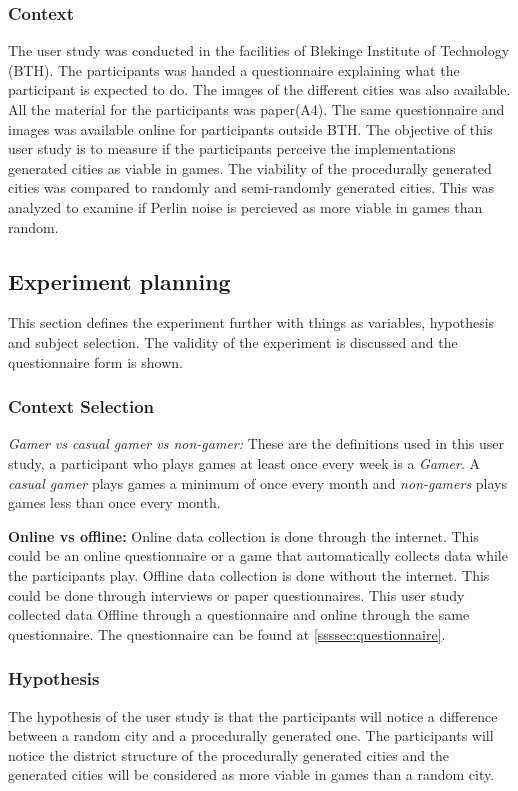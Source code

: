 	\subsubsection{Context}
	The user study was conducted in the facilities of Blekinge Institute of Technology (BTH). The participants was handed a questionnaire explaining what the participant is expected to do. The images of the different cities was also available. All the material for the participants was paper(A4). The same questionnaire and images was available online for participants outside BTH. The objective of this user study is to measure if the participants perceive the implementations generated cities as viable in games. The viability of the procedurally generated cities was compared to randomly and semi-randomly generated cities. This was analyzed to examine if Perlin noise is percieved as more viable in games than random.
	
	\subsection{Experiment planning}
	This section defines the experiment further with things as variables, hypothesis and subject selection. The validity of the experiment is discussed and the questionnaire form is shown.
		
	\subsubsection{Context Selection}
	\textit{Gamer vs casual gamer vs non-gamer:} These are the definitions used in this user study, a participant who plays games at least once every week is a \textit{Gamer}. A \textit{casual gamer} plays games a minimum of once every month and \textit{non-gamers} plays games less than once every month. 
			
	\textbf{Online vs offline: }
	Online data collection is done through the internet. This could be an online questionnaire or a game that automatically collects data while the participants play. Offline data collection is done without the internet. This could be done through interviews or paper questionnaires. This user study collected data Offline through a questionnaire and online through the same questionnaire. The questionnaire can be found at \ref{ssssec:questionnaire}.
			
	\subsubsection{Hypothesis}
	The hypothesis of the user study is that the participants will notice a difference between a random city and a procedurally generated one. The participants will notice the district structure of the procedurally generated cities and the generated cities will be considered as more viable in games than a random city.
			
